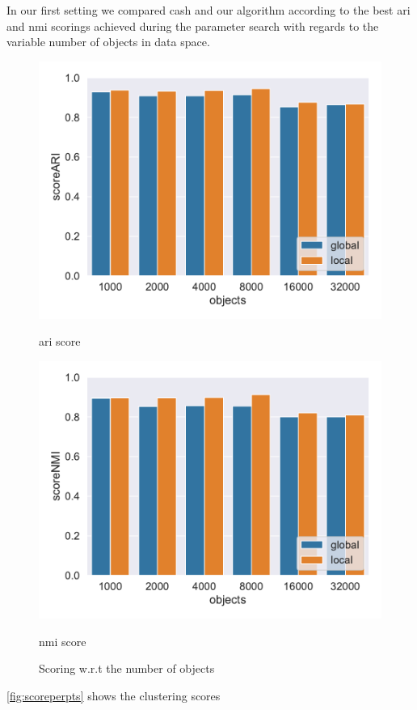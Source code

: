 In our first setting we compared \gls{cash} and our algorithm according to the best \gls{ari} and \gls{nmi} scorings achieved during the parameter search with regards to the variable number of objects in data space. 
\begin{figure}[h]
    \centering
    \begin{minipage}[t]{.5\textwidth}
      \centering  
      \captionsetup{width=.9\linewidth}
      \includegraphics[width=\textwidth]{evaluation/per_objects/Best_ARI_3D_N5_pobjects_bar.pdf}
      \captionsetup{labelformat=empty}
      \caption{\gls{ari} score}
      \label{fig:ariperpts}
    \end{minipage}%
    \begin{minipage}[t]{.5\textwidth}
      \centering
      \captionsetup{width=.9\linewidth}
      \includegraphics[width=\textwidth]{evaluation/per_objects/Best_NMI_3D_N5_pobjects_bar.pdf}
      \captionsetup{labelformat=empty}
      \caption{\gls{nmi} score}
      \label{fig:nmiperpts}
    \end{minipage}
    \caption{Scoring w.r.t the number of objects}
    \label{fig:scoreperpts}
\end{figure}
\autoref{fig:scoreperpts} shows the clustering scores 

